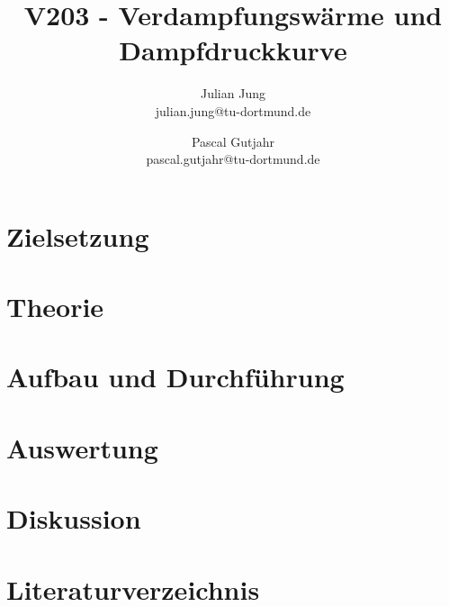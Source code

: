 


\title{V203 - Verdampfungswärme und Dampfdruckkurve}
\author{Julian Jung \\ julian.jung@tu-dortmund.de
  \and Pascal Gutjahr \\ pascal.gutjahr@tu-dortmund.de}
\maketitle
\newpage
\tableofcontents
\newpage
\section{Zielsetzung}
\section{Theorie}
\section{Aufbau und Durchführung}
\section{Auswertung}

\section{Diskussion}
\section{Literaturverzeichnis}


